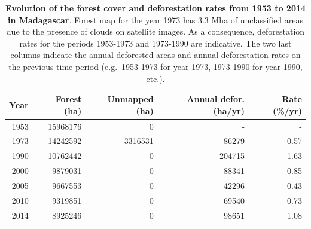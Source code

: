 \documentclass[a4paper, 12pt, leqno]{article} %
\begin{document}
\vfill
\begin{table}[!h]
  \begin{longtable}[]{@{}rrrrr@{}}
    \toprule
    Year & Forest (ha) & Unmapped (ha) & Annual defor. (ha/yr) & Rate
    (\%/yr)\tabularnewline
    \midrule
    \endhead
    1953 & 15968176 & 0 & - & -\tabularnewline
    1973 & 14242592 & 3316531 & 86279 & 0.57\tabularnewline
    1990 & 10762442 & 0 & 204715 & 1.63\tabularnewline
    2000 & 9879031 & 0 & 88341 & 0.85\tabularnewline
    2005 & 9667553 & 0 & 42296 & 0.43\tabularnewline
    2010 & 9319851 & 0 & 69540 & 0.73\tabularnewline
    2014 & 8925246 & 0 & 98651 & 1.08\tabularnewline
    \bottomrule
  \end{longtable}
  \addtocounter{table}{-1}

  \caption{\textbf{Evolution of the forest cover and deforestation
      rates from 1953 to 2014 in Madagascar}. Forest map for the year
    1973 has 3.3 Mha of unclassified areas due to the presence of
    clouds on satellite images. As a consequence, deforestation rates
    for the periods 1953-1973 and 1973-1990 are indicative. The two
    last columns indicate the annual deforested areas and annual
    deforestation rates on the previous time-period (e.g.~1953-1973
    for year 1973, 1973-1990 for year 1990, etc.).}

  \label{tab:forest_cover}
\end{table}
\vfill

\newpage
\end{document}
